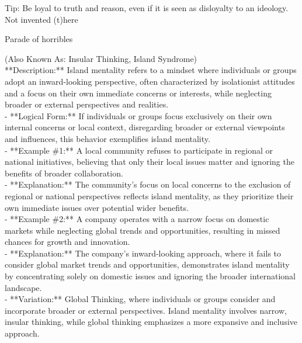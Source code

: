 \documentclass[a4paper,12pt,single,pdftex]{scrbook}
\begin{document}
      
        Tip: Be loyal to truth and reason, even if it is seen as disloyalty to an ideology.
      \\

    
  

Not invented (t)here

Parade of horribles
    
      (Also Known As: Insular Thinking, Island Syndrome)
    \\

  
    
       **Description:** Island mentality refers to a mindset where individuals or groups adopt an inward-looking perspective, often characterized by isolationist attitudes and a focus on their own immediate concerns or interests, while neglecting broader or external perspectives and realities.
    \\

    
      - **Logical Form:** If individuals or groups focus exclusively on their own internal concerns or local context, disregarding broader or external viewpoints and influences, this behavior exemplifies island mentality.
    \\

    
      - **Example \#1:** A local community refuses to participate in regional or national initiatives, believing that only their local issues matter and ignoring the benefits of broader collaboration.
    \\

    
      - **Explanation:** The community’s focus on local concerns to the exclusion of regional or national perspectives reflects island mentality, as they prioritize their own immediate issues over potential wider benefits.
    \\

    
      - **Example \#2:** A company operates with a narrow focus on domestic markets while neglecting global trends and opportunities, resulting in missed chances for growth and innovation.
    \\

    
      - **Explanation:** The company’s inward-looking approach, where it fails to consider global market trends and opportunities, demonstrates island mentality by concentrating solely on domestic issues and ignoring the broader international landscape.
    \\

    
      - **Variation:** Global Thinking, where individuals or groups consider and incorporate broader or external perspectives. Island mentality involves narrow, insular thinking, while global thinking emphasizes a more expansive and inclusive approach.
    \\
\end{document}
